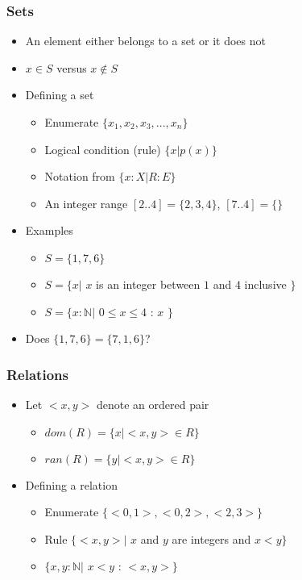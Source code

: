 \documentclass[t,12pt,numbers,fleqn]{beamer}
\begin{document}

\begin{frame}
\frametitle{Sets}
\begin{itemize}
\item An element either belongs to a set or it does not
\item $x \in S$ versus $x \notin S$
\item Defining a set
\begin{itemize}
\item Enumerate $\{ x_1, x_2, x_3, ..., x_n \}$
\item Logical condition (rule) $\{x | p(x) \}$
\item Notation from \cite{GriesAndSchneider1993} $\{x: X | R : E \}$
\item An integer range $[2 .. 4] = \{2, 3, 4\}$, $[7 .. 4] = \{\}$
\end{itemize}
\item Examples
\begin{itemize}
\item $S = \{ 1, 7, 6 \}$
\item $S = \{ x |$ $x$ is an integer between $1$ and $4$ inclusive
  $\}$
\item $S = \{ x: \mathbb{N} |$ $0 \leq x \leq 4$ : $x$ $\}$
\end{itemize}
\item Does $\{ 1, 7, 6 \} = \{ 7, 1, 6 \}$?
\end{itemize}
\end{frame}


\begin{frame}
\frametitle{Relations}
\begin{itemize}
\item Let $<x, y>$ denote an ordered pair
\begin{itemize}
\item $dom(R) = \{x | <x, y> \in R\}$
\item $ran(R) = \{y | <x, y> \in R\}$
\end{itemize}
\item Defining a relation
\begin{itemize}
\item Enumerate $\{ <0, 1>, <0, 2>, <2, 3> \}$
\item Rule $\{ <x, y>|$ $x$ and $y$ are integers and $x < y \}$
\item $\{ x, y: \mathbb{N} |$ $x < y$ : $<x, y> \}$
\end{itemize}
\end{itemize}
\end{frame}
\end{document}
